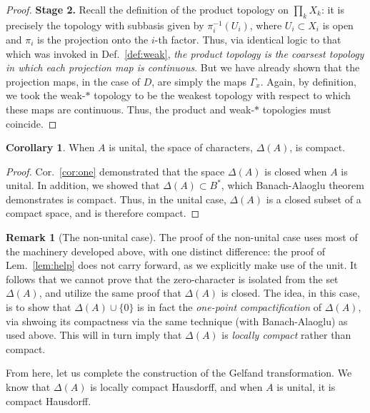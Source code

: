 \documentclass[aps,pra,showpacs,notitlepage,onecolumn,superscriptaddress,nofootinbib]{revtex4-1}
\theoremstyle{definition}
\newtheorem{corollary}{Corollary}[theorem]
\newtheorem{remark}{Remark}[section]
\newcommand{\hhrulefill}{\hspace{-1.5em} \hrulefill}
\begin{document}
\begin{proof}
  \noindent \textbf{Stage 2.} Recall
  the definition of the product topology on $\prod_{k} X_k$: it is precisely the topology with subbasis given by $\pi_i^{-1}(U_i)$, where $U_i \subset X_i$ is
  open and $\pi_i$ is the projection onto the $i$-th factor. Thus, via identical logic to that which was invoked in Def.~\ref{def:weak}, \emph{the product topology
  is the coarsest topology in which each projection map is continuous}. But we have already shown that the projection maps, in the case of $D$, are simply the
  maps $\Gamma_x$. Again, by definition, we took the weak-$*$ topology to be the weakest topology with respect to which these maps are continuous. Thus, the
  product and weak-$*$ topologies must coincide.
  \end{proof}

\begin{corollary}
  When $A$ is unital, the space of characters, $\Delta(A)$, is compact.
\end{corollary}

\begin{proof}
  Cor.~\ref{cor:one} demonstrated that the space $\Delta(A)$ is closed when $A$ is unital.
 In addition, we showed that $\Delta(A) \subset B^{*}$, which Banach-Alaoglu theorem demonstrates is compact. Thus,
  in the unital case, $\Delta(A)$ is a closed subset of a compact space, and is therefore compact.
\end{proof}

\begin{remark}[The non-unital case]
  The proof of the non-unital case uses most of the machinery developed above, with one distinct difference: the proof of Lem.~\ref{lem:help} does not carry forward, as
  we explicitly make use of the unit. It follows that we cannot prove that the zero-character is isolated from the set $\Delta(A)$, and utilize the same proof that $\Delta(A)$
  is closed. The idea, in this case, is to show that $\Delta(A) \cup \{0\}$ is in fact the \emph{one-point compactification} of $\Delta(A)$, via shwoing its compactness via
  the same technique (with Banach-Alaoglu) as used above. This will in turn imply that $\Delta(A)$ is \emph{locally compact} rather than compact.
\end{remark}

\hhrulefill
\newline

\noindent From here, let us complete the construction of the Gelfand transformation. We know that $\Delta(A)$ is locally compact Hausdorff, and when $A$ is unital, it is compact Hausdorff.
\newline
\end{document}
